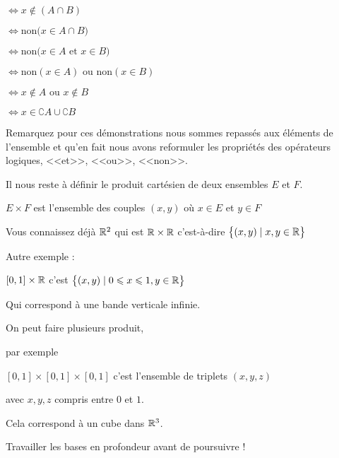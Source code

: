 $\iff x \notin \left( A \cap B \right)$ 

\change

$\iff \text{non} \big(x \in A \cap B\big)$ 

\change

$\iff \text{non} \big(x \in A \text{ et } x \in B\big)$ 

\change

$\iff \text{non} (x \in A) \text{ ou } \text{non} (x \in B)$ 

\change

$\iff x \notin A \text{ ou } x\notin B$ 

\change

$\iff x \in \complement A \cup \complement B$


Remarquez pour ces démonstrations nous sommes repassés aux éléments de l'ensemble 
et qu'en fait nous avons reformuler 
les propriétés des opérateurs logiques, <<et>>, <<ou>>, <<non>>.


\diapo


Il nous reste à définir le produit cartésien de deux ensembles $E$ et $F$.

$E \times F$ est l'ensemble des couples $(x,y)$ où $x \in E$ et $y \in F$

\change

Vous connaissez déjà $\mathbb{R}^2$ qui est 
$\mathbb{R} \times \mathbb{R}$ c'est-à-dire $\big\{ (x,y) \mid x,y \in \mathbb{R} \big\}$

\change


Autre exemple :

$[0,1] \times \mathbb{R}$ c'est $\big\{ (x,y) \mid 0 \leqslant x \leqslant 1, y \in \mathbb{R} \big\}$ 

\change

Qui correspond à une bande verticale infinie.

\change

On peut faire plusieurs produit,

par exemple 

$[0,1] \times [0,1] \times [0,1]$ c'est l'ensemble de triplets $(x,y,z)$

avec $x,y,z$ compris entre $0$ et $1$.

\change

Cela correspond à un cube dans $\mathbb{R}^3$.



\diapo


Travailler les bases en profondeur avant de poursuivre !



